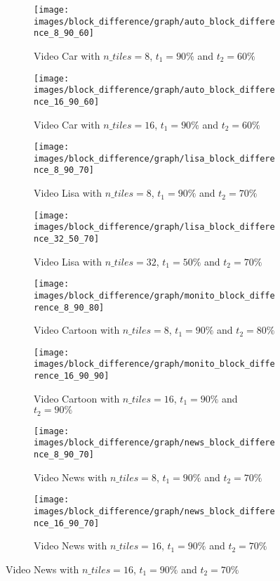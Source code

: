 \documentclass[journal]{IEEEtran}
\begin{document}
\begin{figure}
	\centering
	\begin{subfigure}{0.23\textwidth}
		\centering
		\texttt{[image: images/block\_difference/graph/auto\_block\_difference\_8\_90\_60]} 
		\caption{Video Car with $n\_tiles = 8$, $t_1 = 90\%$ and $t_2 = 60\%$}
		\label{fig:block_difference:graph:auto_8_90_60} 
	\end{subfigure}
	\centering
	\begin{subfigure}{0.23\textwidth}
		\centering
		\texttt{[image: images/block\_difference/graph/auto\_block\_difference\_16\_90\_60]}
		\caption{Video Car with $n\_tiles = 16$, $t_1 = 90\%$ and $t_2 = 60\%$}
		\label{fig:block_difference:graph:car_16_90_60}
	\end{subfigure}
	
	\centering
	\begin{subfigure}{0.23\textwidth}
		\centering
		\texttt{[image: images/block\_difference/graph/lisa\_block\_difference\_8\_90\_70]} 
		\caption{Video Lisa with $n\_tiles = 8$, $t_1 = 90\%$ and $t_2 = 70\%$}
		\label{fig:block_difference:graph:lisa_8_90_70} 
	\end{subfigure}
	\centering
	\begin{subfigure}{0.23\textwidth}
		\centering
		\texttt{[image: images/block\_difference/graph/lisa\_block\_difference\_32\_50\_70]}
		\caption{Video Lisa with $n\_tiles = 32$, $t_1 = 50\%$ and $t_2 = 70\%$}
		\label{fig:block_difference:graph:lisa_32_50_70}
	\end{subfigure}

	\centering
	\begin{subfigure}{0.23\textwidth}
		\centering
		\texttt{[image: images/block\_difference/graph/monito\_block\_difference\_8\_90\_80]} 
		\caption{Video Cartoon with $n\_tiles = 8$, $t_1 = 90\%$ and $t_2 = 80\%$}
		\label{fig:block_difference:graph:cartoon_8_90_80} 
	\end{subfigure}
	\centering
	\begin{subfigure}{0.23\textwidth}
		\centering
		\texttt{[image: images/block\_difference/graph/monito\_block\_difference\_16\_90\_90]}
		\caption{Video Cartoon with $n\_tiles = 16$, $t_1 = 90\%$ and $t_2 = 90\%$}
		\label{fig:block_difference:graph:cartoon_16_90_90}
	\end{subfigure}

	\centering
	\begin{subfigure}{0.23\textwidth}
		\centering
		\texttt{[image: images/block\_difference/graph/news\_block\_difference\_8\_90\_70]} 
		\caption{Video News with $n\_tiles = 8$, $t_1 = 90\%$ and $t_2 = 70\%$}
		\label{fig:block_difference:graph:news_8_90_70} 
	\end{subfigure}
	\centering
	\begin{subfigure}{0.23\textwidth}
		\centering
		\texttt{[image: images/block\_difference/graph/news\_block\_difference\_16\_90\_70]}
		\caption{Video News with $n\_tiles = 16$, $t_1 = 90\%$ and $t_2 = 70\%$}
		\label{fig:block_difference:graph:news_16_90_70}
	\end{subfigure}



\end{figure}
\end{document}
